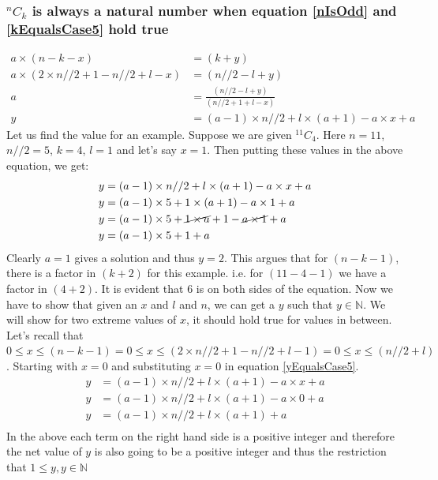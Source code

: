 \documentclass[10pt, twoside]{article}
\newcommand*{\Combination}[2]{{}^{#1}C_{#2}}%
\begin{document}
\subsubsection{$\Combination{n}{k}$ is always a natural number when equation \eqref{nIsOdd} and \eqref{kEqualsCase5} hold true}\label{ProofkEqualsCase5}
\begin{align}
	a \times (n-k-x) &= (k+y) \nonumber \\
	a \times (2\times n//2 + 1 - n//2 +l - x) &= (n//2 -l + y) \nonumber \\
	a &= \frac{(n//2 -l + y)}{(n//2 + 1 +l - x)} \nonumber \\
	y &= (a-1)\times n//2 + l\times(a+1) - a\times x + a \label{yEqualsCase5}	
\end{align}
Let us find the value for an example. Suppose we are given $\Combination{11}{4}$. Here $n=11$, $n//2=5$, $k=4$, $l=1$ and let's say $x=1$. Then putting these values in the above equation, we get:
\begin{align*}
	y &= (a-1)\times n//2 + l\times(a+1) - a\times x + a \\
	y &= (a-1)\times 5 + 1\times(a+1) - a\times 1 + a \\
	y &= (a-1)\times 5 + \cancel{1\times a}+ 1 - \cancel{a\times 1} + a \\
	y &= (a-1)\times 5 + 1 + a \\
\end{align*}
Clearly $a=1$ gives a solution and thus $y=2$. This argues that for $(n-k-1)$, there is a factor in $(k+2)$ for this example. i.e. for $(11-4-1)$ we have a factor in $(4+2)$. It is evident that $6$ is on both sides of the equation.\newline
Now we have to show that given an $x$ and $l$ and $n$, we can get a $y$ such that $y \in \mathbb{N}$. We will show for two extreme values of $x$, it should hold true for values in between.\newline
Let's recall that $0 \leq x \leq (n-k-1) = 0 \leq x \leq (2\times n//2+1-n//2+l-1) = 0 \leq x \leq (n//2 + l)$. Starting with $x=0$ and substituting $x=0$ in equation \eqref{yEqualsCase5}.
\begin{align*}
	y &= (a-1)\times n//2 + l\times(a+1) - a\times x + a \\
	y &= (a-1)\times n//2 + l\times(a+1) - a\times 0 + a \\	
	y &= (a-1)\times n//2 + l\times(a+1) + a \\		
\end{align*}
In the above each term on the right hand side is a positive integer and therefore the net value of $y$ is also going to be a positive integer and thus the restriction that $1 \leq y, y \in \mathbb{N}$\newline
\end{document}

